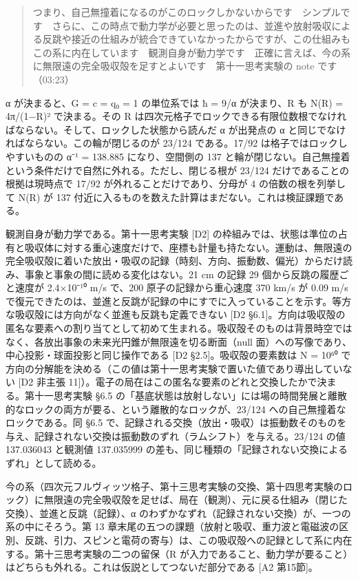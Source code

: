 \documentclass[
  a4paper,
]{ltjsarticle}
\begin{document}
\begin{quote}
つまり、自己無撞着になるのがこのロックしかないからです　シンプルです　さらに、この時点で動力学が必要と思ったのは、並進や放射吸収による反跳や接近の仕組みが統合できていなかったからですが、この仕組みもこの系に内在しています　観測自身が動力学です　正確に言えば、今の系に無限遠の完全吸収殻を足すとよいです　第十一思考実験の
note です（03:23）
\end{quote}

α が決まると、G = c = q₀ = 1 の単位系では ħ = 9/α が決まり、R も N(R) =
4π/(1−R)² で決まる。その R
は四次元格子でロックできる有限位数根でなければならない。そして、ロックした状態から読んだ
α が出発点の α と同じでなければならない。この輪が閉じるのが 23/124
である。17/92 は格子ではロックしやすいものの α⁻¹ = 138.885
になり、空間側の 137
と輪が閉じない。自己無撞着という条件だけで自然に外れる。ただし、閉じる根が
23/124 だけであることの根拠は現時点で 17/92
が外れることだけであり、分母が 4 の倍数の根を列挙して N(R) が 137
付近に入るものを数えた計算はまだない。これは検証課題である。

観測自身が動力学である。第十一思考実験 {[}D2{]}
の枠組みでは、状態は準位の占有と吸収体に対する重心速度だけで、座標も計量も持たない。運動は、無限遠の完全吸収殻に着いた放出・吸収の記録（時刻、方向、振動数、偏光）からだけ読み、事象と事象の間に読める変化はない。21
cm の記録 29 個から反跳の履歴ごと速度が 2.4×10⁻¹⁰ m/s で、200
原子の記録から重心速度 370 km/s が 0.09 m/s
で復元できたのは、並進と反跳が記録の中にすでに入っていることを示す。等方な吸収殻には方向がなく並進も反跳も定義できない
{[}D2
§6.1{]}。方向は吸収殻の匿名な要素への割り当てとして初めて生まれる。吸収殻そのものは背景時空ではなく、各放出事象の未来光円錐が無限遠を切る断面（null
面）への写像であり、中心投影・球面投影と同じ操作である {[}D2
§2.5{]}。吸収殻の要素数は N = 10⁶⁰
で方向の分解能を決める（この値は第十一思考実験で置いた値であり導出していない
{[}D2 非主張
11{]}）。電子の局在はこの匿名な要素のどれと交換したかで決まる。第十一思考実験
§6.5
の「基底状態は放射しない」には場の時間発展と離散的なロックの両方が要る、という離散的なロックが、23/124
への自己無撞着なロックである。同 §6.5
で、記録される交換（放出・吸収）は振動数そのものを与え、記録されない交換は振動数のずれ（ラムシフト）を与える。23/124
の値 137.036043 と観測値 137.035999
の差も、同じ種類の「記録されない交換によるずれ」として読める。

今の系（四次元フルヴィッツ格子、第十三思考実験の交換、第十四思考実験のロック）に無限遠の完全吸収殻を足せば、局在（観測）、元に戻る仕組み（閉じた交換）、並進と反跳（記録）、α
のわずかなずれ（記録されない交換）が、一つの系の中にそろう。第 13
章末尾の五つの課題（放射と吸収、重力波と電磁波の区別、反跳、引力、スピンと電荷の寄与）は、この吸収殻への記録として系に内在する。第十三思考実験の二つの留保（R
が入力であること、動力学が要ること）はどちらも外れる。これは仮説としてつないだ部分である
{[}A2 第15節{]}。
\end{document}
